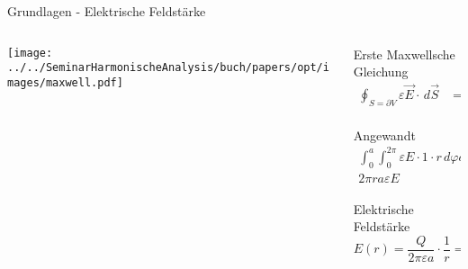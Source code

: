 \begin{frame}{Grundlagen - Elektrische Feldstärke}
    \begin{columns}
        \begin{column}{0.5\textwidth}
            \begin{center}
                \texttt{[image: ../../SeminarHarmonischeAnalysis/buch/papers/opt/images/maxwell.pdf]}
            \end{center}
        \end{column}

        \begin{column}{0.5\textwidth}
            \begin{block}{Erste Maxwellsche Gleichung}
                \begin{align*}
                    \oint_{S=\partial V} \varepsilon\vec{E} \cdot\, d\vec{S}
                    &=
                    \int_{V}\rho\, dV
                    \\
                \end{align*}
            \end{block}
            \pause
            \begin{block}{Angewandt}
                \begin{align*}
                    \int_{0}^{a}\int_{0}^{2\pi} \varepsilon E\cdot 1 \cdot r\, d\varphi dl
                    &=
                    Q
                    \\
                    2\pi ra\varepsilon E
                    &=
                    Q
                \end{align*}
            \end{block}
            \pause
            \begin{exampleblock}{Elektrische Feldstärke}
                \begin{equation*}
                    E(r)
                    =
                    \frac{Q}{2\pi\varepsilon a} \cdot \frac{1}{r}
                    =
                    C \cdot \frac{1}{r}
                \end{equation*}
            \end{exampleblock}
        \end{column}
    \end{columns}
\end{frame}
